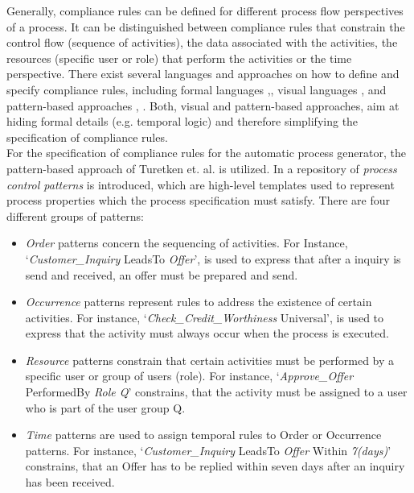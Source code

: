 Generally, compliance rules can be defined for different process flow perspectives of a process. It can be distinguished between compliance rules that constrain the control flow (sequence of activities), the data associated with the activities, the resources (specific user or role) that perform the activities or the time perspective. There exist several languages and approaches on how to define and specify compliance rules, including formal languages \cite{Ghose2007},\cite{GovMilSad:edoc:06:compliance}, visual languages \cite{sabrina953},\cite{Awad2008} and pattern-based approaches \cite{compliance_patterns}, \cite{Ramezani2012}. Both, visual and pattern-based approaches, aim at hiding formal details (e.g. temporal logic) and therefore simplifying the specification of compliance rules. \\

For the specification of compliance rules for the automatic process generator, the pattern-based approach of Turetken et. al. \cite{compliance_patterns} is utilized. In \cite{compliance_patterns} a repository of \textit{process control patterns} is introduced, which are high-level templates used to represent process properties which the process specification must satisfy. There are four different groups of patterns: 

\begin{itemize}
\item \textit{Order} patterns concern the sequencing of activities. For Instance, `\textit{Customer\_Inquiry} LeadsTo \textit{Offer}', is used to express that after a inquiry is send and received, an offer must be prepared and send.
\item \textit{Occurrence} patterns represent rules to address the existence of certain activities. For instance, `\textit{Check\_Credit\_Worthiness} Universal', is used to express that the activity must always occur when the process is executed. 
\item \textit{Resource} patterns constrain that certain activities must be performed by a specific user or group of users (role). For instance, `\textit{Approve\_Offer} PerformedBy \textit{Role Q}' constrains, that the activity must be assigned to a user who is part of the user group Q.    
\item \textit{Time} patterns are used to assign temporal rules to Order or Occurrence patterns. For instance, `\textit{Customer\_Inquiry} LeadsTo \textit{Offer} Within \textit{7(days)}' constrains, that an Offer has to be replied within seven days after an inquiry has been received. 
\end{itemize}


